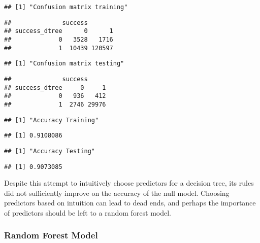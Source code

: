 \documentclass[11pt,letterpaper,]{article}
\newenvironment{Shaded}{\begin{snugshade}}{\end{snugshade}}
\newcommand{\CommentTok}[1]{\textcolor[rgb]{0.56,0.35,0.01}{\textit{{#1}}}}
\theoremstyle{definition}
\theoremstyle{definition}
\theoremstyle{definition}
\theoremstyle{remark}
\begin{document}
\begin{verbatim}
## [1] "Confusion matrix training"
\end{verbatim}

\begin{verbatim}
##              success
## success_dtree      0      1
##             0   3528   1716
##             1  10439 120597
\end{verbatim}

\begin{verbatim}
## [1] "Confusion matrix testing"
\end{verbatim}

\begin{verbatim}
##              success
## success_dtree     0     1
##             0   936   412
##             1  2746 29976
\end{verbatim}

\begin{verbatim}
## [1] "Accuracy Training"
\end{verbatim}

\begin{verbatim}
## [1] 0.9108086
\end{verbatim}

\begin{verbatim}
## [1] "Accuracy Testing"
\end{verbatim}

\begin{verbatim}
## [1] 0.9073085
\end{verbatim}

Despite this attempt to intuitively choose predictors for a decision
tree, its rules did not sufficiently improve on the accuracy of the null
model. Choosing predictors based on intuition can lead to dead ends, and
perhaps the importance of predictors should be left to a random forest
model.

\subsubsection{Random Forest Model}\label{random-forest-model-1}

\begin{Shaded}
\end{Shaded}
\end{document}
